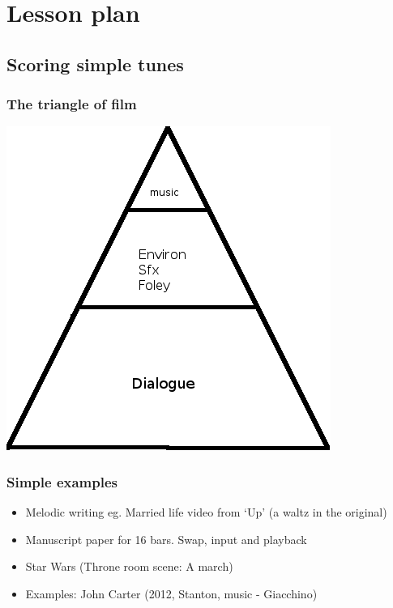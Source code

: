 
\chapter{Lesson plan}
\label{lessonplan}


\section{Scoring simple tunes}

\subsection{The triangle of film}
\includegraphics[scale=2.0]{triangleoffilm} 

\subsection{Simple examples}
\begin{itemize}
\item Melodic writing eg. Married life video from `Up' (a waltz in the original)
\item Manuscript paper for 16 bars. Swap, input and playback
\item Star Wars (Throne room scene: A march)
\item Examples: John Carter (2012, Stanton, music - Giacchino)
\end{itemize}

